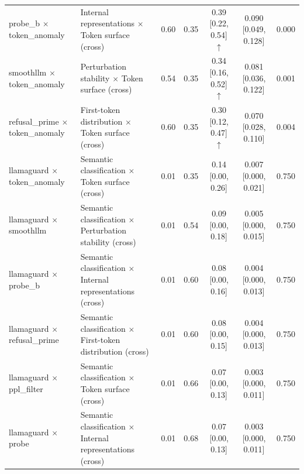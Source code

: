 \begin{tabular}{llccccc}
probe_b $\times$ token_anomaly & Internal representations $\times$ Token surface (cross) & 0.60 & 0.35 & 0.39 [0.22, 0.54] $\uparrow$ & 0.090 [0.049, 0.128] & 0.000 \\
smoothllm $\times$ token_anomaly & Perturbation stability $\times$ Token surface (cross) & 0.54 & 0.35 & 0.34 [0.16, 0.52] $\uparrow$ & 0.081 [0.036, 0.122] & 0.001 \\
refusal_prime $\times$ token_anomaly & First-token distribution $\times$ Token surface (cross) & 0.60 & 0.35 & 0.30 [0.12, 0.47] $\uparrow$ & 0.070 [0.028, 0.110] & 0.004 \\
llamaguard $\times$ token_anomaly & Semantic classification $\times$ Token surface (cross) & 0.01 & 0.35 & 0.14 [0.00, 0.26]  & 0.007 [0.000, 0.021] & 0.750 \\
llamaguard $\times$ smoothllm & Semantic classification $\times$ Perturbation stability (cross) & 0.01 & 0.54 & 0.09 [0.00, 0.18]  & 0.005 [0.000, 0.015] & 0.750 \\
llamaguard $\times$ probe_b & Semantic classification $\times$ Internal representations (cross) & 0.01 & 0.60 & 0.08 [0.00, 0.16]  & 0.004 [0.000, 0.013] & 0.750 \\
llamaguard $\times$ refusal_prime & Semantic classification $\times$ First-token distribution (cross) & 0.01 & 0.60 & 0.08 [0.00, 0.15]  & 0.004 [0.000, 0.013] & 0.750 \\
llamaguard $\times$ ppl_filter & Semantic classification $\times$ Token surface (cross) & 0.01 & 0.66 & 0.07 [0.00, 0.13]  & 0.003 [0.000, 0.011] & 0.750 \\
llamaguard $\times$ probe & Semantic classification $\times$ Internal representations (cross) & 0.01 & 0.68 & 0.07 [0.00, 0.13]  & 0.003 [0.000, 0.011] & 0.750 \\
\bottomrule
\end{tabular}